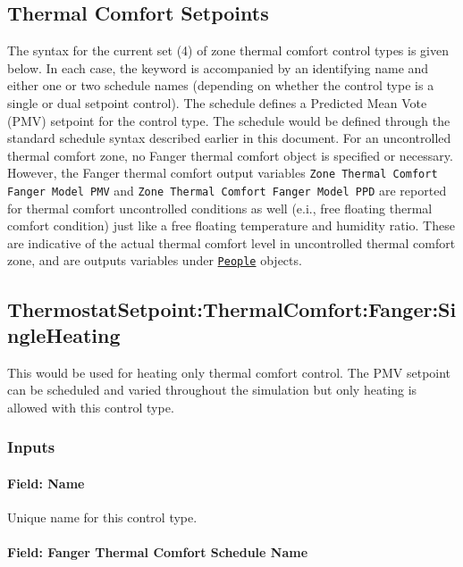 \subsection{Thermal Comfort Setpoints}\label{thermal-comfort-setpoints}

The syntax for the current set (4) of zone thermal comfort control types is given below. In each case, the keyword is accompanied by an identifying name and either one or two schedule names (depending on whether the control type is a single or dual setpoint control). The schedule defines a Predicted Mean Vote (PMV) setpoint for the control type. The schedule would be defined through the standard schedule syntax described earlier in this document. For an uncontrolled thermal comfort zone, no Fanger thermal comfort object is specified or necessary. However, the Fanger thermal comfort output variables \lstinline!Zone Thermal Comfort Fanger Model PMV! and \lstinline!Zone Thermal Comfort Fanger Model PPD! are reported for thermal comfort uncontrolled conditions as well (e.i., free floating thermal comfort condition) just like a free floating temperature and humidity ratio.   These are indicative of the actual thermal comfort level in uncontrolled thermal comfort zone, and are outputs variables under \hyperref[people]{\lstinline!People!} objects.

\subsection{ThermostatSetpoint:ThermalComfort:Fanger:SingleHeating}\label{thermostatsetpointthermalcomfortfangersingleheating}

This would be used for heating only thermal comfort control. The PMV setpoint can be scheduled and varied throughout the simulation but only heating is allowed with this control type.

\subsubsection{Inputs}\label{inputs-10-023}

\paragraph{Field: Name}\label{field-name-8-024}

Unique name for this control type.

\paragraph{Field: Fanger Thermal Comfort Schedule Name}\label{field-fanger-thermal-comfort-schedule-name}

